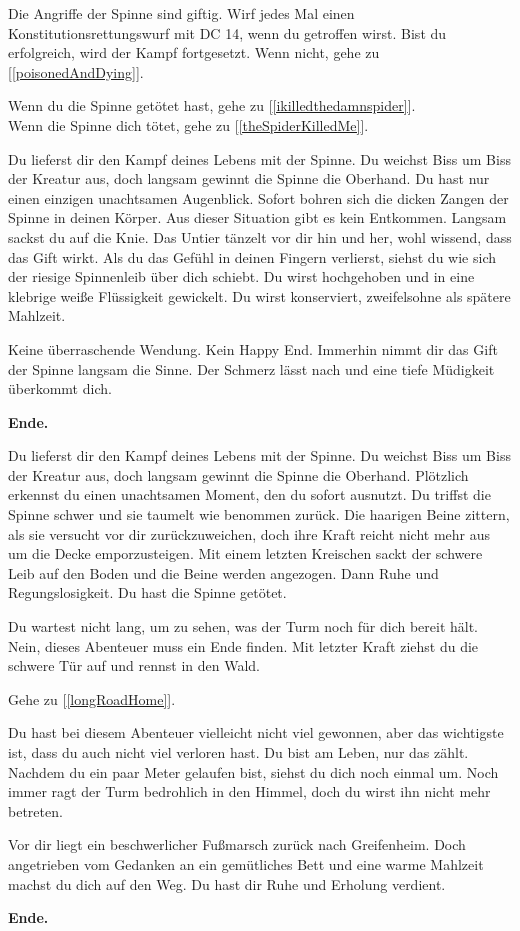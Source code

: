 Die Angriffe der Spinne sind giftig. Wirf jedes Mal einen Konstitutionsrettungswurf mit
DC 14, wenn du getroffen wirst. Bist du erfolgreich, wird der Kampf fortgesetzt.
Wenn nicht, gehe zu [\ref{poisonedAndDying}].

Wenn du die Spinne getötet hast, gehe zu [\ref{ikilledthedamnspider}].
\\Wenn die Spinne dich tötet, gehe zu [\ref{theSpiderKilledMe}].


Du lieferst dir den Kampf deines Lebens mit der Spinne. Du weichst Biss um Biss der Kreatur aus, doch langsam gewinnt die Spinne die Oberhand. Du hast nur einen einzigen unachtsamen Augenblick. Sofort bohren sich die dicken Zangen der Spinne in deinen Körper. Aus dieser Situation gibt es kein Entkommen. Langsam sackst du auf die Knie. Das Untier tänzelt vor dir hin und her, wohl wissend, dass das Gift wirkt. Als du das Gefühl in deinen Fingern verlierst, siehst du wie sich der riesige Spinnenleib über dich schiebt. Du wirst hochgehoben und in eine klebrige weiße Flüssigkeit gewickelt. Du wirst konserviert, zweifelsohne als spätere Mahlzeit.

Keine überraschende Wendung. Kein Happy End. Immerhin nimmt dir das Gift der Spinne langsam die Sinne. Der Schmerz lässt nach und eine tiefe Müdigkeit überkommt dich.

\textbf{Ende.}


Du lieferst dir den Kampf deines Lebens mit der Spinne. Du weichst Biss um Biss der Kreatur aus, doch langsam gewinnt die Spinne die Oberhand. Plötzlich erkennst du einen unachtsamen Moment, den du sofort ausnutzt. Du triffst die Spinne schwer und sie taumelt wie benommen zurück. Die haarigen Beine zittern, als sie versucht vor dir zurückzuweichen, doch ihre Kraft reicht nicht mehr aus um die Decke emporzusteigen. Mit einem letzten Kreischen sackt der schwere Leib auf den Boden und die Beine werden angezogen. Dann Ruhe und Regungslosigkeit. Du hast die Spinne getötet.

Du wartest nicht lang, um zu sehen, was der Turm noch für dich bereit hält. Nein, dieses Abenteuer muss ein Ende finden. Mit letzter Kraft ziehst du die schwere Tür auf und rennst in den Wald.

Gehe zu [\ref{longRoadHome}].


Du hast bei diesem Abenteuer vielleicht nicht viel gewonnen, aber das wichtigste ist, dass du auch nicht viel verloren hast. Du bist am Leben, nur das zählt. Nachdem du ein paar Meter gelaufen bist, siehst du dich noch einmal um. Noch immer ragt der Turm bedrohlich in den Himmel, doch du wirst ihn nicht mehr betreten.

Vor dir liegt ein beschwerlicher Fußmarsch zurück nach Greifenheim. Doch angetrieben vom Gedanken an ein gemütliches Bett und eine warme Mahlzeit machst du dich auf den Weg. Du hast dir Ruhe und Erholung verdient.

\textbf{Ende.}
